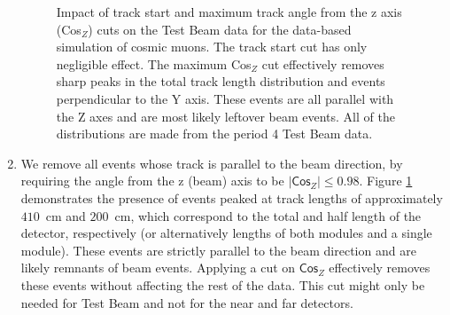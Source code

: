 \begin{enumerate}
\begin{figure}[!ht]
\caption{Impact of track start and maximum track angle from the z axis (Cos$_Z$) cuts on the Test Beam data for the data-based simulation of cosmic muons. The track start cut has only negligible effect. The maximum Cos$_Z$ cut effectively removes sharp peaks in the total track length distribution and events perpendicular to the Y axis. These events are all parallel with the Z axes and are most likely leftover beam events. All of the distributions are made from the period 4 Test Beam data.}
\label{figCosZSelectionComparison}
\end{figure}

\item We remove all events whose track is parallel to the beam direction, by requiring the angle from the z (beam) axis to be $|\textsf{Cos}_Z|\leq 0.98$. Figure \ref{figCosZSelectionComparison} demonstrates the presence of events peaked at track lengths of approximately $410$~cm and $200$~cm, which correspond to the total and half length of the detector, respectively (or alternatively lengths of both modules and a single module). These events are strictly parallel to the beam direction and are likely remnants of beam events. Applying a cut on $\textsf{Cos}_Z$ effectively removes these events without affecting the rest of the data. This cut might only be needed for Test Beam and not for the near and far detectors.


\end{enumerate}
